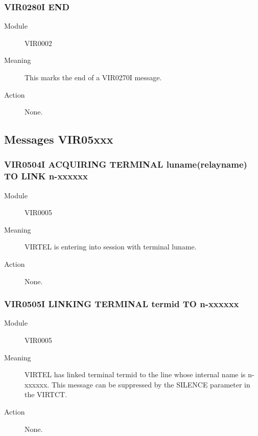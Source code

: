 \documentclass[letterpaper,10pt,english]{sphinxmanual}
\begin{document}
\subsubsection{VIR0280I END}
\label{\detokenize{messages:vir0280i-end}}\begin{description}
\item[{Module}] \leavevmode
VIR0002

\item[{Meaning}] \leavevmode
This marks the end of a VIR0270I message.

\item[{Action}] \leavevmode
None.

\end{description}


\subsection{Messages VIR05xxx}
\label{\detokenize{messages:messages-vir05xxx}}

\subsubsection{VIR0504I ACQUIRING TERMINAL luname(relayname) TO LINK n-xxxxxx}
\label{\detokenize{messages:vir0504i-acquiring-terminal-luname-relayname-to-link-n-xxxxxx}}\begin{description}
\item[{Module}] \leavevmode
VIR0005

\item[{Meaning}] \leavevmode
VIRTEL is entering into session with terminal luname.

\item[{Action}] \leavevmode
None.

\end{description}


\subsubsection{VIR0505I  LINKING TERMINAL termid TO n-xxxxxx}
\label{\detokenize{messages:vir0505i-linking-terminal-termid-to-n-xxxxxx}}\begin{description}
\item[{Module}] \leavevmode
VIR0005

\item[{Meaning}] \leavevmode
VIRTEL has linked terminal termid to the line whose internal name is n-xxxxxx. This message can be suppressed by the SILENCE parameter in the VIRTCT.

\item[{Action}] \leavevmode
None.

\end{description}
\end{document}
